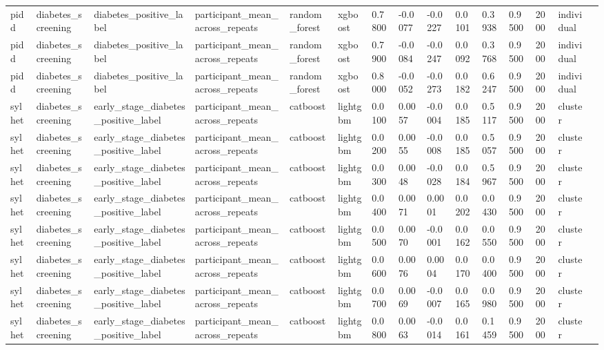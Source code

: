 \begin{tabular}{lllllllllllllll}
pidd & diabetes\_screening & diabetes\_positive\_label & participant\_mean\_across\_repeats & random\_forest & xgboost & 0.7800 & -0.0077 & -0.0227 & 0.0101 & 0.3938 & 0.9500 & 2000 & individual &  \\
pidd & diabetes\_screening & diabetes\_positive\_label & participant\_mean\_across\_repeats & random\_forest & xgboost & 0.7900 & -0.0084 & -0.0247 & 0.0092 & 0.3768 & 0.9500 & 2000 & individual &  \\
pidd & diabetes\_screening & diabetes\_positive\_label & participant\_mean\_across\_repeats & random\_forest & xgboost & 0.8000 & -0.0052 & -0.0273 & 0.0182 & 0.6247 & 0.9500 & 2000 & individual &  \\
sylhet & diabetes\_screening & early\_stage\_diabetes\_positive\_label & participant\_mean\_across\_repeats & catboost & lightgbm & 0.0100 & 0.0057 & -0.0004 & 0.0185 & 0.5117 & 0.9500 & 2000 & cluster &  \\
sylhet & diabetes\_screening & early\_stage\_diabetes\_positive\_label & participant\_mean\_across\_repeats & catboost & lightgbm & 0.0200 & 0.0055 & -0.0008 & 0.0185 & 0.5057 & 0.9500 & 2000 & cluster &  \\
sylhet & diabetes\_screening & early\_stage\_diabetes\_positive\_label & participant\_mean\_across\_repeats & catboost & lightgbm & 0.0300 & 0.0048 & -0.0028 & 0.0184 & 0.5967 & 0.9500 & 2000 & cluster &  \\
sylhet & diabetes\_screening & early\_stage\_diabetes\_positive\_label & participant\_mean\_across\_repeats & catboost & lightgbm & 0.0400 & 0.0071 & 0.0001 & 0.0202 & 0.0430 & 0.9500 & 2000 & cluster &  \\
sylhet & diabetes\_screening & early\_stage\_diabetes\_positive\_label & participant\_mean\_across\_repeats & catboost & lightgbm & 0.0500 & 0.0070 & -0.0001 & 0.0162 & 0.0550 & 0.9500 & 2000 & cluster &  \\
sylhet & diabetes\_screening & early\_stage\_diabetes\_positive\_label & participant\_mean\_across\_repeats & catboost & lightgbm & 0.0600 & 0.0076 & 0.0004 & 0.0170 & 0.0400 & 0.9500 & 2000 & cluster &  \\
sylhet & diabetes\_screening & early\_stage\_diabetes\_positive\_label & participant\_mean\_across\_repeats & catboost & lightgbm & 0.0700 & 0.0069 & -0.0007 & 0.0165 & 0.0980 & 0.9500 & 2000 & cluster &  \\
sylhet & diabetes\_screening & early\_stage\_diabetes\_positive\_label & participant\_mean\_across\_repeats & catboost & lightgbm & 0.0800 & 0.0063 & -0.0014 & 0.0161 & 0.1459 & 0.9500 & 2000 & cluster &  \\

\end{tabular}
